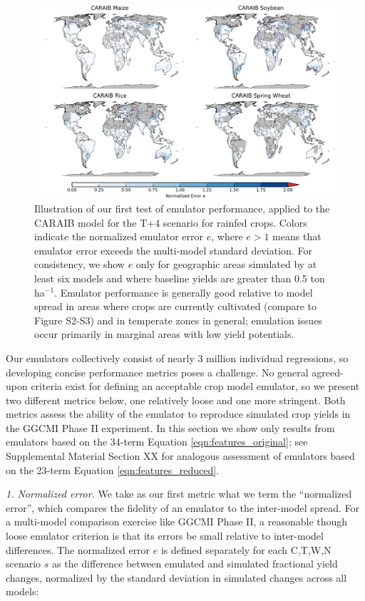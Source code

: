 \documentclass[gmd, manuscript]{copernicus} %
\begin{document}
\begin{figure}[ht]
\centering
    \includegraphics[width=16.3cm]{figures/CARAIB_spatial_error.png}
    \caption{
    Illustration of our first test of emulator performance, applied to the CARAIB model for the T+4 scenario for rainfed crops. 
    Colors indicate the normalized emulator error $e$, where $e > 1$ means that emulator error exceeds the multi-model standard deviation. 
    For consistency, we show $e$ only for geographic areas simulated by at least six models and where baseline yields are greater than 0.5 ton ha$^{-1}$.
    Emulator performance is generally good relative to model spread in areas where crops are currently cultivated (compare to Figure S2-S3) and in temperate zones in general; emulation issues occur primarily in marginal areas with low yield potentials. 
    }
   \label{fig:error}
\end{figure}

Our emulators collectively consist of nearly 3 million individual regressions, so developing concise performance metrics poses a challenge.
No general agreed-upon criteria exist for defining an acceptable crop model emulator, so we present two different metrics below, one relatively loose and one more stringent.  
Both metrics assess the ability of the emulator to reproduce simulated crop yields in the GGCMI Phase II experiment. 
In this section we show only results from emulators based on the 34-term Equation \ref{eqn:features_original};
see Supplemental Material Section XX for analogous assessment of emulators based on the 23-term Equation \ref{eqn:features_reduced}.

\smallskip
\textit{1. Normalized error.} 
We take as our first metric what we term the ``normalized error'', which compares the fidelity of an emulator to the inter-model spread. 
For a multi-model comparison exercise like GGCMI Phase II, a reasonable though loose emulator criterion is that its errors be small relative to inter-model differences. The normalized error $e$ is defined separately for each C,T,W,N scenario $s$ as the difference between emulated and simulated fractional yield changes, normalized by the standard deviation in simulated changes across all models: 
\end{document}
